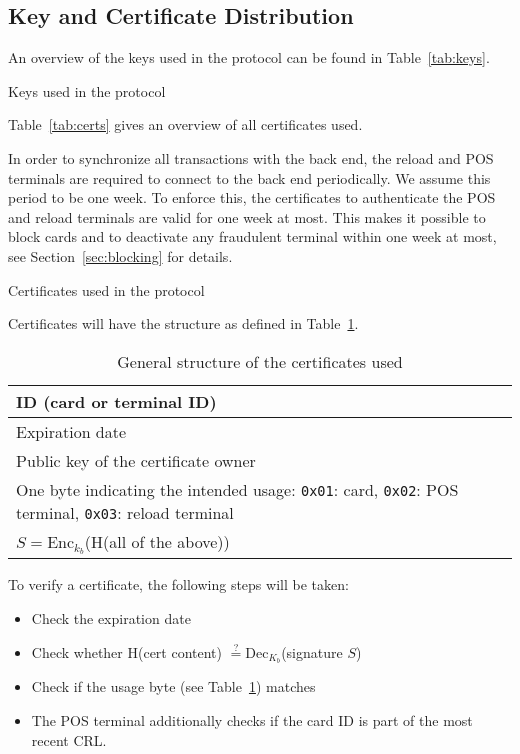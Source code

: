 \subsection{Key and Certificate Distribution}

An overview of the keys used in the protocol can be found in Table~\ref{tab:keys}.
\begin{table}[h]
    \centering
    
    \caption{Keys used in the protocol}
    \label{tab:keys}
\end{table}

Table~\ref{tab:certs} gives an overview of all certificates used.

In order to synchronize all transactions with the back end, the reload and POS terminals are required to connect to the back end periodically.
We assume this period to be one week.
To enforce this, the certificates to authenticate the POS and reload terminals are valid for one week at most.
This makes it possible to block cards and to deactivate any fraudulent terminal within one week at most, see Section~\ref{sec:blocking} for details.

\begin{table}[h!]
    \centering
    
    \caption{Certificates used in the protocol}
    \label{tab:certs}
\end{table}

Certificates will have the structure as defined in Table~\ref{tab:certStructure}.
\begin{table}[h!]
    \centering
    \begin{tabular}{|p{8cm}|}
    \hline
        ID (card or terminal ID) \\
    \hline
        Expiration date \\
    \hline
        Public key of the certificate owner \\
    \hline
        One byte indicating the intended usage: \texttt{0x01}: card, \texttt{0x02}: POS terminal, \texttt{0x03}: reload terminal \\
    \hline
        $S = \textrm{Enc}_{k_b}$(H(all of the above)) \\
    \hline
    \end{tabular}
    \caption{General structure of the certificates used}
    \label{tab:certStructure}
\end{table}

To verify a certificate, the following steps will be taken:
\begin{itemize}
    \item Check the expiration date
    \item Check whether H(cert content) $\stackrel{?}{=} \textrm{Dec}_{K_b}$(signature $S$)
    \item Check if the usage byte (see Table~\ref{tab:certStructure}) matches
    \item The POS terminal additionally checks if the card ID is part of the most recent CRL\@.
\end{itemize}


